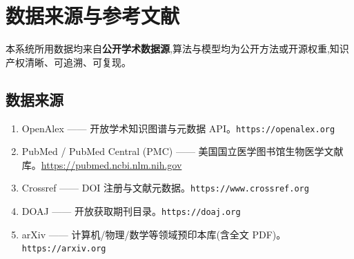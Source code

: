 \section{数据来源与参考文献}

\begin{plainbox}
本系统所用数据均来自\textbf{公开学术数据源},算法与模型均为公开方法或开源权重,知识产权清晰、可追溯、可复现。
\end{plainbox}

\subsection{数据来源}
\begin{enumerate}[label=D\arabic*.]
\item OpenAlex —— 开放学术知识图谱与元数据 API。\texttt{https://openalex.org}
\item PubMed / PubMed Central (PMC) —— 美国国立医学图书馆生物医学文献库。\url{https://pubmed.ncbi.nlm.nih.gov}
\item Crossref —— DOI 注册与文献元数据。\texttt{https://www.crossref.org}
\item DOAJ —— 开放获取期刊目录。\texttt{https://doaj.org}
\item arXiv —— 计算机/物理/数学等领域预印本库(含全文 PDF)。\texttt{https://arxiv.org}
\end{enumerate}


